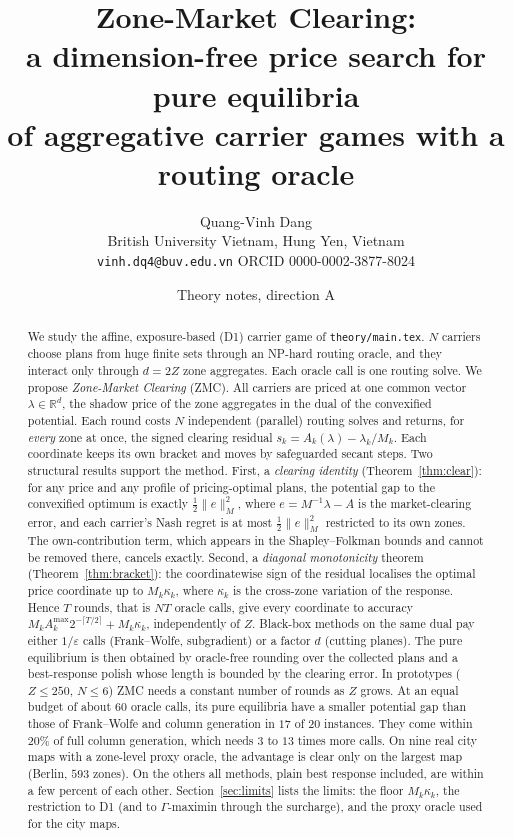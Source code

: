\documentclass[11pt]{article}
\title{Zone-Market Clearing:\\ a dimension-free price search for pure equilibria\\ of aggregative carrier games with a routing oracle}
\author{Quang-Vinh Dang\\ British University Vietnam, Hung Yen, Vietnam\\ \texttt{vinh.dq4@buv.edu.vn} \quad ORCID 0000-0002-3877-8024}
\date{Theory notes, direction A}
\theoremstyle{definition}
\theoremstyle{remark}
\newcommand{\R}{\mathbb{R}}
\newcommand{\Amax}{A^{\max}}
\begin{document}
\maketitle

\begin{abstract}
We study the affine, exposure-based (D1) carrier game of \texttt{theory/main.tex}. $N$ carriers choose plans from huge finite sets through an NP-hard routing oracle, and they interact only through $d=2Z$ zone aggregates. Each oracle call is one routing solve. We propose \emph{Zone-Market Clearing} (ZMC). All carriers are priced at one common vector $\lambda\in\R^d$, the shadow price of the zone aggregates in the dual of the convexified potential. Each round costs $N$ independent (parallel) routing solves and returns, for \emph{every} zone at once, the signed clearing residual $s_k=A_k(\lambda)-\lambda_k/M_k$. Each coordinate keeps its own bracket and moves by safeguarded secant steps. Two structural results support the method. First, a \emph{clearing identity} (Theorem~\ref{thm:clear}): for any price and any profile of pricing-optimal plans, the potential gap to the convexified optimum is exactly $\tfrac12\|e\|_M^2$, where $e=M^{-1}\lambda-A$ is the market-clearing error, and each carrier's Nash regret is at most $\tfrac12\|e\|^2_M$ restricted to its own zones. The own-contribution term, which appears in the Shapley--Folkman bounds and cannot be removed there, cancels exactly. Second, a \emph{diagonal monotonicity} theorem (Theorem~\ref{thm:bracket}): the coordinatewise sign of the residual localises the optimal price coordinate up to $M_k\kappa_k$, where $\kappa_k$ is the cross-zone variation of the response. Hence $T$ rounds, that is $NT$ oracle calls, give every coordinate to accuracy $M_k\Amax_k2^{-\lceil T/2\rceil}+M_k\kappa_k$, independently of $Z$. Black-box methods on the same dual pay either $1/\varepsilon$ calls (Frank--Wolfe, subgradient) or a factor $d$ (cutting planes). The pure equilibrium is then obtained by oracle-free rounding over the collected plans and a best-response polish whose length is bounded by the clearing error. In prototypes ($Z\le250$, $N\le6$) ZMC needs a constant number of rounds as $Z$ grows. At an equal budget of about $60$ oracle calls, its pure equilibria have a smaller potential gap than those of Frank--Wolfe and column generation in $17$ of $20$ instances. They come within $20\%$ of full column generation, which needs $3$ to $13$ times more calls. On nine real city maps with a zone-level proxy oracle, the advantage is clear only on the largest map (Berlin, $593$ zones). On the others all methods, plain best response included, are within a few percent of each other. Section~\ref{sec:limits} lists the limits: the floor $M_k\kappa_k$, the restriction to D1 (and to $\Gamma$-maximin through the surcharge), and the proxy oracle used for the city maps.
\end{abstract}
\end{document}
